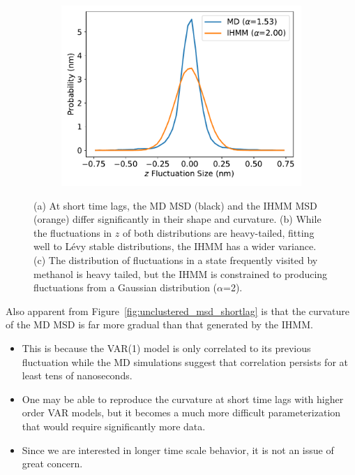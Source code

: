 \documentclass[journal=jpcbfk,manuscript=article]{achemso}
\begin{document}
\begin{figure}
\begin{subfigure}{0.32\textwidth}
  \includegraphics[width=\textwidth]{state_emission_widths.pdf}
  \caption{}\label{fig:state_emission_widths}
  \end{subfigure}
  \caption{(a) At short time lags, the MD MSD (black) and the IHMM MSD (orange)
  differ significantly in their shape and curvature. (b) While the 
  fluctuations in $z$ of both distributions are heavy-tailed, fitting well to L\'evy
  stable distributions, the IHMM has a wider variance. (c) The distribution of 
  fluctuations in a state frequently visited by methanol is heavy tailed, but the 
  IHMM is constrained to producing fluctuations from a Gaussian distribution ($\alpha$=2).
  }\label{fig:short_timelags}
  \end{figure}
  
  Also apparent from Figure~\ref{fig:unclustered_msd_shortlag} is that the 
  curvature of the MD MSD is far more gradual than that generated by the IHMM.
  \begin{itemize}
    \item This is because the VAR(1) model is only correlated to its previous
    fluctuation while the MD simulations suggest that correlation persists for
    at least tens of nanoseconds.
    \item One may be able to reproduce the curvature at short time lags with
    higher order VAR models, but it becomes a much more difficult parameterization
    that would require significantly more data.
    \item Since we are interested in longer time scale behavior, it is not an 
    issue of great concern.
  \end{itemize}
  
\end{document}
